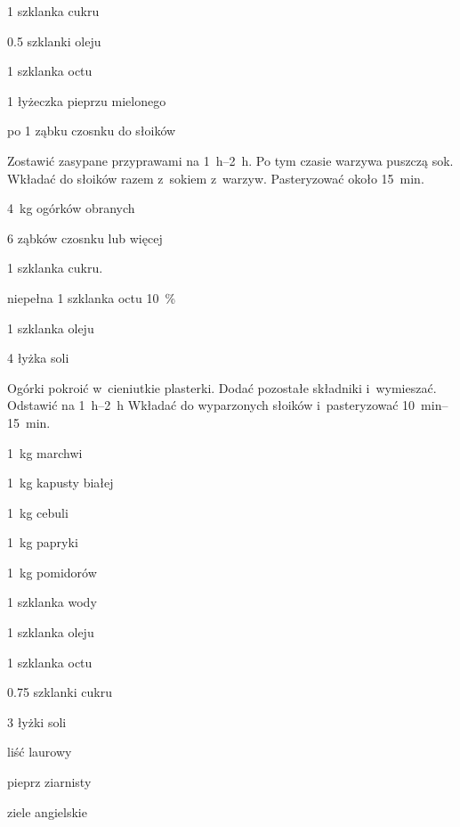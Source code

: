 \documentclass[../kucharek.tex]{subfiles}
\begin{document}
\begin{Ingred}[zalewa]
    \item \num{1} szklanka cukru
    \item \num{0.5} szklanki oleju
    \item \num{1} szklanka octu
    \item \num{1} łyżeczka pieprzu mielonego
    \item po \num{1} ząbku czosnku do słoików
\end{Ingred}

Zostawić zasypane przyprawami na \qtyrange{1}{2}{\hour}. Po tym czasie warzywa
puszczą sok. Wkładać do słoików razem z~sokiem z~warzyw. Pasteryzować około
\qty{15}{\minute}.


\begin{Ingred}
    \item \qty{4}{\kilo\gram} ogórków obranych
    \item \num{6} ząbków czosnku lub więcej
    \item \num{1} szklanka cukru.
    \item niepełna \num{1} szklanka octu \qty{10}{\percent}
    \item \num{1} szklanka oleju
    \item \num{4} łyżka soli
\end{Ingred}

Ogórki pokroić w~cieniutkie plasterki. Dodać pozostałe składniki i~wymieszać.
Odstawić na \qtyrange{1}{2}{\hour} Wkładać do wyparzonych słoików
i~pasteryzować \qtyrange{10}{15}{\minute}.


\begin{Ingred}
    \item \qty{1}{\kilo\gram} marchwi
    \item \qty{1}{\kilo\gram} kapusty białej
    \item \qty{1}{\kilo\gram} cebuli
    \item \qty{1}{\kilo\gram} papryki
    \item \qty{1}{\kilo\gram} pomidorów
\end{Ingred}

\begin{Ingred}[zalewa]
    \item \num{1} szklanka wody
    \item \num{1} szklanka oleju
    \item \num{1} szklanka octu
    \item \num{0.75} szklanki cukru
    \item \num{3} łyżki soli
    \item liść laurowy
    \item pieprz ziarnisty
    \item ziele angielskie
\end{Ingred}
\end{document}
